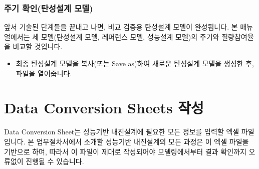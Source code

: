 \documentclass[a4paper,10pt,korean]{sphinxmanual}
\begin{document}
\subsubsection{주기 확인(탄성설계 모델)}
\label{\detokenize{1_period_check_elastic:id1}}\label{\detokenize{1_period_check_elastic::doc}}
\sphinxAtStartPar
앞서 기술된 단계들을 끝내고 나면, 비교 검증용 탄성설계 모델이 완성됩니다.
본 매뉴얼에서는 세 모델(탄성설계 모델, 레퍼런스 모델, 성능설계 모델)의 주기와 질량참여율을 비교할 것입니다.

\begin{sphinxShadowBox}
\begin{itemize}
\item {} 
\sphinxAtStartPar
최종 탄성설계 모델을 복사(또는 Save as)하여 새로운 탄성설계 모델을 생성한 후, 파일을 열어줍니다.

\end{itemize}
\end{sphinxShadowBox}

\sphinxstepscope


\section{Data Conversion Sheets 작성}
\label{\detokenize{2_data_conv_sheets:data-conversion-sheets}}\label{\detokenize{2_data_conv_sheets::doc}}
\sphinxAtStartPar
{} 

\sphinxAtStartPar
Data Conversion Sheet는 성능기반 내진설계에 필요한 모든 정보를 입력할 엑셀 파일입니다.
본 업무절차서에서 소개할 성능기반 내진설계의 모든 과정은 이 엑셀 파일을 기반으로 하며,
따라서 이 파일이 제대로 작성되어야 모델링에서부터 결과 확인까지 오류없이 진행될 수 있습니다.
\end{document}
